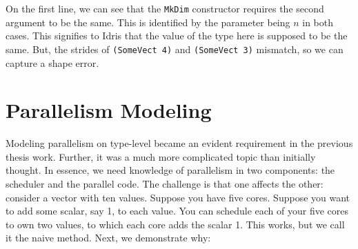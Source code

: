 \documentclass{report}
\begin{document}
On the first line, we can see that the \verb|MkDim| constructor requires the second argument to be the same. This is identified by the parameter being $n$ in both cases. This signifies to Idris that the value of the type here is supposed to be the same. But, the strides of \verb|(SomeVect 4)| and \verb|(SomeVect 3)| mismatch, so we can capture a shape error.

\section{Parallelism Modeling}
\label{section:parmodeling}

Modeling parallelism on type-level became an evident requirement in the previous thesis work. Further, it was a much more complicated topic than initially thought. In essence, we need knowledge of parallelism in two components: the scheduler and the parallel code. The challenge is that one affects the other: consider a vector with ten values. Suppose you have five cores. Suppose you want to add some scalar, say 1, to each value. You can schedule each of your five cores to own two values, to which each core adds the scalar 1. This works, but we call it the naive method. Next, we demonstrate why:
\end{document}
